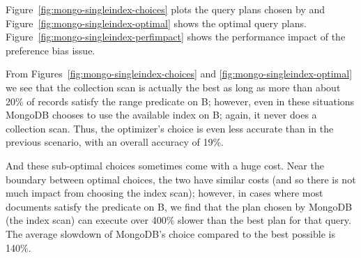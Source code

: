 

Figure~\ref{fig:mongo-singleindex-choices} plots the query plans chosen by \relname and Figure~\ref{fig:mongo-singleindex-optimal} shows the optimal query plans. Figure~\ref{fig:mongo-singleindex-perfimpact} shows the performance impact of the preference bias issue. 

From Figures~\ref{fig:mongo-singleindex-choices} and \ref{fig:mongo-singleindex-optimal} we see that the collection scan is actually the best as long as more than about 20\% of records satisfy the range predicate on B; however, even in these situations MongoDB chooses to use the available index on B; again, it never does a collection scan. Thus, the optimizer's choice is even less accurate than in the previous scenario, with an overall accuracy of 19\%. %

And these sub-optimal choices sometimes come with a huge cost. Near the boundary between optimal choices, the two have similar costs (and so there is not much impact from choosing the index scan); however, in cases where most documents satisfy the predicate on B, we find that the plan chosen by MongoDB (the index scan) can execute over 400\% slower than the best plan for that query. The average slowdown of MongoDB's choice compared to the best possible is 140\%.

